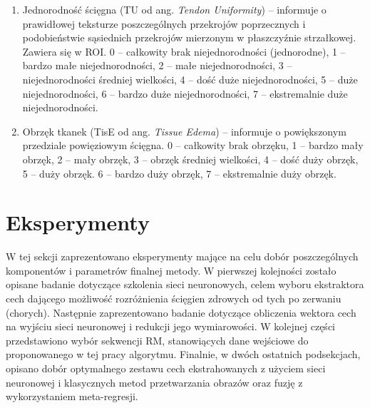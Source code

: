 \begin{enumerate}
	\item Jednorodność ścięgna (TU od ang. \textit{Tendon Uniformity}) -- informuje o prawidłowej teksturze poszczególnych przekrojów poprzecznych i podobieństwie sąsiednich przekrojów mierzonym w płaszczyźnie strzałkowej. Zawiera się w ROI. 0 – całkowity brak niejednorodności (jednorodne), 1 – bardzo małe niejednorodności, 2 – małe niejednorodności, 3 – niejednorodności średniej wielkości, 4 – dość duże niejednorodności, 5 – duże niejednorodności, 6 – bardzo duże niejednorodności, 7 –  ekstremalnie duże niejednorodności. 
	\item Obrzęk tkanek (TisE od ang. \textit{Tissue Edema}) -- informuje o powiększonym przedziale powięziowym ścięgna. 0  – całkowity brak obrzęku, 1 – bardzo mały obrzęk, 2 – mały obrzęk, 3 – obrzęk średniej wielkości, 4 – dość duży obrzęk, 5 – duży obrzęk. 6 – bardzo duży obrzęk, 7 -- ekstremalnie duży obrzęk.
\end{enumerate}

\section{Eksperymenty}
\label{seq:experiments}
W tej sekcji zaprezentowano eksperymenty mające na celu dobór poszczególnych komponentów i parametrów finalnej metody. W pierwszej kolejności zostało opisane badanie dotyczące szkolenia sieci neuronowych, celem wyboru ekstraktora cech dającego możliwość rozróżnienia ścięgien zdrowych od tych po zerwaniu (chorych). Następnie zaprezentowano badanie dotyczące obliczenia wektora cech na wyjściu sieci neuronowej i redukcji jego wymiarowości. W kolejnej części przedstawiono wybór sekwencji RM, stanowiących dane wejściowe do proponowanego w tej pracy algorytmu. Finalnie, w dwóch ostatnich podsekcjach, opisano dobór optymalnego zestawu cech ekstrahowanych z użyciem sieci neuronowej i klasycznych metod przetwarzania obrazów oraz fuzję z wykorzystaniem meta-regresji.  



